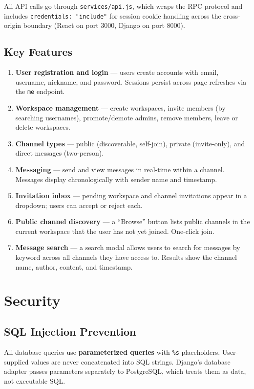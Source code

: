 \documentclass[11pt]{article}
\begin{document}
All API calls go through \texttt{services/api.js}, which wraps the RPC protocol and includes \texttt{credentials: "include"} for session cookie handling across the cross-origin boundary (React on port 3000, Django on port 8000).

\subsection{Key Features}

\begin{enumerate}
    \item \textbf{User registration and login} --- users create accounts with email, username, nickname, and password. Sessions persist across page refreshes via the \texttt{me} endpoint.
    \item \textbf{Workspace management} --- create workspaces, invite members (by searching usernames), promote/demote admins, remove members, leave or delete workspaces.
    \item \textbf{Channel types} --- public (discoverable, self-join), private (invite-only), and direct messages (two-person).
    \item \textbf{Messaging} --- send and view messages in real-time within a channel. Messages display chronologically with sender name and timestamp.
    \item \textbf{Invitation inbox} --- pending workspace and channel invitations appear in a dropdown; users can accept or reject each.
    \item \textbf{Public channel discovery} --- a ``Browse'' button lists public channels in the current workspace that the user has not yet joined. One-click join.
    \item \textbf{Message search} --- a search modal allows users to search for messages by keyword across all channels they have access to. Results show the channel name, author, content, and timestamp.
\end{enumerate}


\newpage
\section{Security}
\label{sec:security}

\subsection{SQL Injection Prevention}

All database queries use \textbf{parameterized queries} with \texttt{\%s} placeholders. User-supplied values are never concatenated into SQL strings. Django's database adapter passes parameters separately to PostgreSQL, which treats them as data, not executable SQL.
\end{document}

